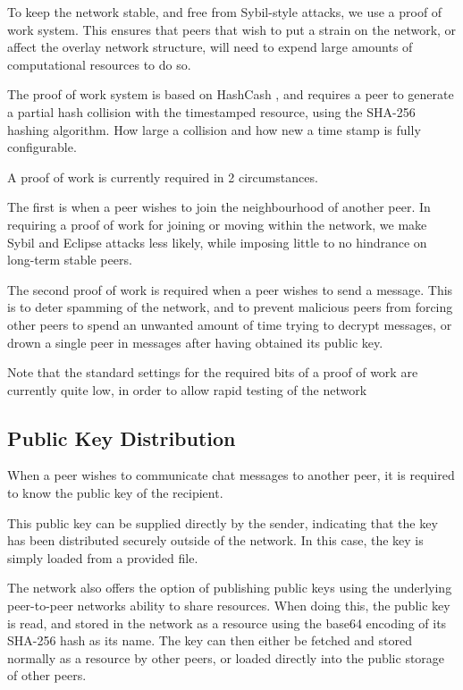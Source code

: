 To keep the network stable, and free from Sybil-style attacks, we use a proof of work system. This ensures that peers that wish to put a strain on the network, or affect the overlay network structure, will need to expend large amounts of computational resources to do so.

The proof of work system is based on HashCash \citep{HashCash}, and requires a peer to generate a partial hash collision with the timestamped resource, using the SHA-256 hashing algorithm. How large a collision and how new a time stamp is fully configurable.

A proof of work is currently required in 2 circumstances.

The first is when a peer wishes to join the neighbourhood of another peer. In requiring a proof of work for joining or moving within the network, we make Sybil and Eclipse attacks less likely, while imposing little to no hindrance on long-term stable peers.

The second proof of work is required when a peer wishes to send a message. This is to deter spamming of the network, and to prevent malicious peers from forcing other peers to spend an unwanted amount of time trying to decrypt messages, or drown a single peer in messages after having obtained its public key.

Note that the standard settings for the required bits of a proof of work are currently quite low, in order to allow rapid testing of the network

\subsection{Public Key Distribution}

When a peer wishes to communicate chat messages to another peer, it is required to know the public key of the recipient.

This public key can be supplied directly by the sender, indicating that the key has been distributed securely outside of the network. In this case, the key is simply loaded from a provided file.

The network also offers the option of publishing public keys using the underlying peer-to-peer networks ability to share resources. When doing this, the public key is read, and stored in the network as a resource using the base64 encoding of its SHA-256 hash as its name. The key can then either be fetched and stored normally as a resource by other peers, or loaded directly into the public storage of other peers.

